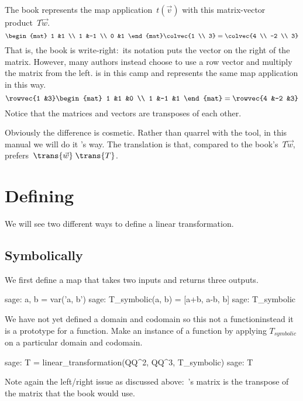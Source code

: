 The book represents 
the map application~$t(\vec{v})$ 
with this matrix-vector product~$T\vec{w}$.
\begin{equation*}
  \begin{mat}
    1 &1 \\
    1 &-1 \\
    0 &1
  \end{mat}
  \colvec{1 \\ 3}
  =
  \colvec{4 \\ -2 \\ 3}
\end{equation*}
That is, the book is write-right:~its notation puts the vector on the right 
of the matrix.
However, many authors instead choose to
use a row vector and multiply the matrix from the left.
\Sage{} is in this camp and
represents the same map application in this way.
\begin{equation*}
  \rowvec{1 &3}
  \begin{mat}
    1 &1  &0 \\
    1 &-1 &1
  \end{mat}
  =
  \rowvec{4 &-2 &3}
\end{equation*}
Notice that the matrices and vectors are transposes of each other.

Obviously the difference is cosmetic.
Rather than quarrel with the tool, in this manual we will do it
\Sage's way.
The translation is that, compared to the book's~$T\vec{w}$,
\Sage{} prefers~$\trans{\vec{w}}\;\trans{T}$.



  

\section{Defining}
We will see two different ways to define a linear transformation.

\subsection{Symbolically}
We first define a map that takes two inputs and returns three outputs.
\begin{sagecommandline}
sage: a, b = var('a, b')   
sage: T_symbolic(a, b) = [a+b, a-b, b]         
sage: T_symbolic       
\end{sagecommandline}
We have not yet defined a domain and codomain 
so this not a function\Dash instead it is a prototype for a function.
Make an instance of a function by applying $T_{\textit{symbolic}}$ on a 
particular domain and codomain.  %
\begin{sagecommandline} 
sage: T = linear_transformation(QQ^2, QQ^3, T_symbolic)
sage: T                                              
\end{sagecommandline}
\noindent Note again the left/right issue as discussed above:~\Sage's matrix is 
the transpose of the matrix that the book would use.


